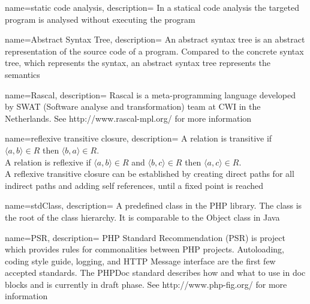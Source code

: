 \documentclass[main.tex]{subfiles}
\begin{document}
    {
        name=static code analysis,
        description={
        	In a statical code analysis the targeted program is analysed without executing the program}
    }
    
    {
        name=Abstract Syntax Tree,
        description={
        	An abstract syntax tree is an abstract representation of the source code of a program.
        	Compared to the concrete syntax tree, which represents the syntax, an abstract syntax tree represents the semantics}
    }
    
    {
        name=Rascal,
        description={
            Rascal is a meta-programming language developed by SWAT (Software analyse and transformation) team at CWI in the Netherlands}.
            See http://www.rascal-mpl.org/ for more information}
    
    {
        name=reflexive transitive closure,
        description={
            A relation is transitive if $\langle a,b \rangle \in R$ then $\langle b,a \rangle \in R$. \\
            A relation is reflexive if $\langle a,b \rangle \in R$ and $\langle b,c \rangle \in R$ then $\langle a,c \rangle \in R$. \\
            A reflexive transitive closure can be established by creating direct paths for all indirect paths and adding self references, until a fixed point is reached}
    }
    
    {
        name=stdClass,
        description={
            A predefined class in the PHP library. The class is the root of the class hierarchy. 
            It is comparable to the Object class in Java}
    }
    
    {
        name=PSR,
        description={
            PHP Standard Recommendation (PSR) is project which provides rules for commonalities between PHP projects.
            Autoloading, coding style guide, logging, and HTTP Message interface are the first few accepted standards.
            The PHPDoc standard describes how and what to use in doc blocks and is currently in draft phase.  
            See http://www.php-fig.org/ for more information}
    }
\end{document}
